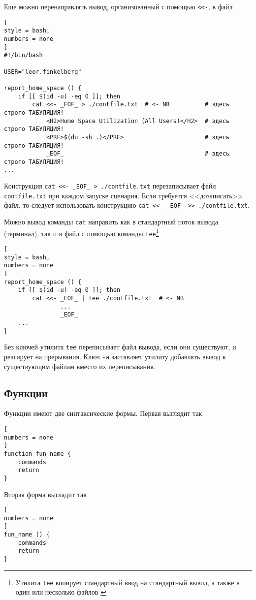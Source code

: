 \documentclass[%
	11pt,
	a4paper,
	utf8,
		]{article}
\begin{document}
Еще можно перенаправлять вывод, организованный с помощью \verb|<<-|, в файл
\begin{lstlisting}[
style = bash,
numbers = none
]
#!/bin/bash

USER="leor.finkelberg"

report_home_space () {
    if [[ $(id -u) -eq 0 ]]; then
        cat <<- _EOF_ > ./contfile.txt  # <- NB          # здесь строго ТАБУЛЯЦИЯ!
            <H2>Home Space Utilization (All Users)</H2>  # здесь строго ТАБУЛЯЦИЯ!
            <PRE>$(du -sh .)</PRE>                       # здесь строго ТАБУЛЯЦИЯ!
            _EOF_                                        # здесь строго ТАБУЛЯЦИЯ!
...
\end{lstlisting}

Конструкция \verb|cat <<- _EOF_ > ./contfile.txt| перезаписывает файл \texttt{contfile.txt} при каждом запуске сценария. Если требуется <<дозаписать>> файл, то следует использовать конструкцию \verb|cat <<- _EOF_ >> ./contfile.txt|.

Можно вывод команды \texttt{cat} направить как в стандартный поток вывода (терминал), так и в файл с помощью команды \texttt{tee}\footnote{Утилита \texttt{tee} копирует стандартный ввод на стандартный вывод, а также в один или несколько файлов \cite{sobel:linux-2011}}
\begin{lstlisting}[
style = bash,
numbers = none
]
report_home_space () {
    if [[ $(id -u) -eq 0 ]]; then
        cat <<- _EOF_ | tee ./contfile.txt  # <- NB
                ...
                _EOF_
    ...
}
\end{lstlisting}

Без ключей утилита \texttt{tee} переписывает файл вывода, если они существуют, и реагирует на прерывания. Ключ \verb|-a| заставляет утилиту добавлять вывод к существующим файлам вместо их переписывания.

\subsection{Функции}

Функции имеют две синтаксические формы. Первая выглядит так
\begin{lstlisting}[
numbers = none
]
function fun_name {
    commands
    return 
}
\end{lstlisting}

Вторая форма выгладит так
\begin{lstlisting}[
numbers = none
]
fun_name () {
    commands
    return
}
\end{lstlisting}
\end{document}
